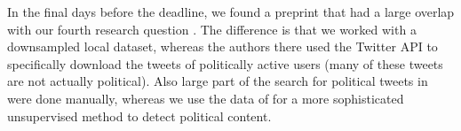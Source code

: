 In the final days before the deadline, we found a preprint that had a large overlap with our fourth research question \cite{tw_useful}. The difference is that we worked with a downsampled local dataset, whereas the authors there used the Twitter API to specifically download the tweets of politically active users (many of these tweets are not actually political). Also large part of the search for political tweets in \cite{tw_useful} were done manually, whereas we use the data of \cite{tw_useful} for a more sophisticated unsupervised method to detect political content.  